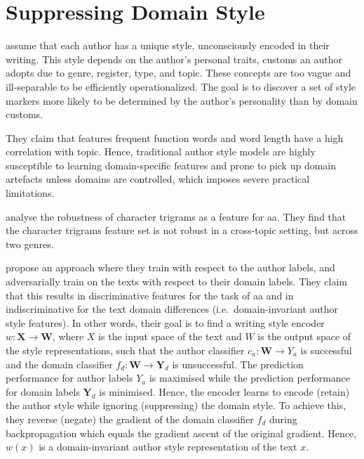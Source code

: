 \section{Suppressing Domain Style}

\citet{bischoff_importance_2020} assume that each author has a unique style, unconsciously encoded in their writing.
This style depends on the author's personal traits, customs an author adopts due to genre, register, type, and topic.
These concepts are too vague and ill-separable to be efficiently operationalized.
The goal is to discover a set of style markers more likely to be determined by the author's personality than by domain customs.

They claim that features frequent function words and word length have a high correlation with topic. 
Hence, traditional author style models are highly susceptible to learning domain-specific features and 
prone to pick up domain artefacts unless domains are controlled, 
which imposes severe practical limitations.

\citet{bischoff_importance_2020} analyse the robustness of character trigrams as a feature for \ac{aa}.
They find that the character trigrams feature set is not robust in a cross-topic setting, but across two genres.

\citet{bischoff_importance_2020} propose an approach where they train with respect to the author labels, 
and adversarially train on the texts with respect to their domain labels.
They claim that this results in discriminative features for the task of \ac{aa} and in 
indiscriminative for the text domain differences (i.e.\ domain-invariant author style features).
In other words, their goal is to find a writing style encoder $w: \textbf{X} \to \textbf{W}$, 
where $X$ is the input space of the text and $W$ is the output space of the style representations, 
such that the author classifier $c_a: \textbf{W} \to Y_a$ is successful and 
the domain classifier $f_d: \textbf{W} \to \textbf{Y}_d$ is unsuccessful.
The prediction performance for author labels $Y_a$ is maximised while the 
prediction performance for domain labels $\textbf{Y}_d$ is minimised.
Hence, the encoder learns to encode (retain) the author style while ignoring (suppressing) the domain style.
To achieve this, they reverse (negate) the gradient of the domain classifier $f_d$ during backpropagation 
which equals the gradient ascent of the original gradient.
Hence, $w(x)$ is a domain-invariant author style representation of the text $x$. 


